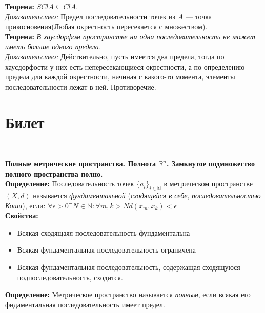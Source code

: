\documentclass[a4paper,100pt]{article}
\theoremstyle{indented}
\begin{document}
     \textbf{Теорема:} 
     $SClA \subseteq ClA.$ \\
     
     \textit{Доказательство:} Предел последовательности точек из $A$ --- точка прикосновения(Любая окрестность пересекается с множеством).\\
     
     \textbf{Теорема:}
     \textit{В хаусдорфом пространстве ни одна последовательность не может иметь больше одного предела.}\\
     
     \textit{Доказательство:} Действительно, пусть имеется два предела, тогда по хаусдорфости у них есть непересекающиеся окрестности, а по определению предела для каждой окрестности, начиная с какого-то момента, элементы последовательности лежат в ней. Противоречие.

\section{Билет} \

\medskip

\textbf{Полные метрические пространства. Полнота $\mathbb{R}^n$. Замкнутое подмножество полного пространства полно.}\\

\textbf{Определение:} Последовательность точек $\{a_i\}_{i \in \mathbb{N}}$ в метрическом пространстве $(X, d)$ называется \textit{фундаментальной} (\textit{сходящейся в себе}, \textit{последовательностью Коши}), если: $\forall \epsilon > 0 \exists N \in \mathbb{N}: \forall m, k > N d(x_m, x_k) < \epsilon$
\\

\textbf{Свойства:}
\begin{itemize}
    \item Всякая сходящаяя последовательность фундаментальна
    \item Всякая фундаментальная последовательность ограничена
    \item Всякая фундаментальная последовательность, содержащая сходящуюся подпоследовательность, сходится.
\end{itemize}
\textbf{Определение:} Метрическое пространство называется \textit{полным}, если всякая его фндаментальная последовательность имеет предел.
\\
\end{document}
